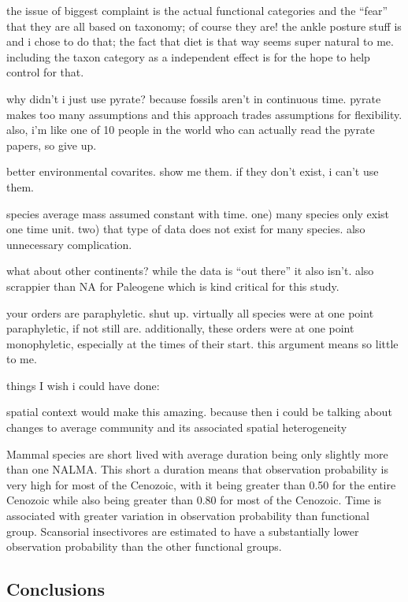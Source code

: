 \documentclass[12pt,letterpaper]{article}
\begin{document}
the issue of biggest complaint is the actual functional categories and the ``fear'' that they are all based on taxonomy; of course they are! the ankle posture stuff is and i chose to do that; the fact that diet is that way seems super natural to me. including the taxon category as a independent effect is for the hope to help control for that. 

why didn't i just use pyrate? because fossils aren't in continuous time. pyrate makes too many assumptions and this approach trades assumptions for flexibility. also, i'm like one of 10 people in the world who can actually read the pyrate papers, so give up.

better environmental covarites. show me them. if they don't exist, i can't use them.

species average mass assumed constant with time. one) many species only exist one time unit. two) that type of data does not exist for many species. also unnecessary complication.

what about other continents? while the data is ``out there'' it also isn't. also scrappier than NA for Paleogene which is kind critical for this study.

your orders are paraphyletic. shut up. virtually all species were at one point paraphyletic, if not still are. additionally, these orders were at one point monophyletic, especially at the times of their start. this argument means so little to me.



things I wish i could have done:

spatial context would make this amazing. because then i could be talking about changes to average community and its associated spatial heterogeneity






Mammal species are short lived with average duration being only slightly more than one NALMA. This short a duration means that observation probability is very high for most of the Cenozoic, with it being greater than 0.50 for the entire Cenozoic while also being greater than 0.80 for most of the Cenozoic. Time is associated with greater variation in observation probability than functional group. Scansorial insectivores are estimated to have a substantially lower observation probability than the other functional groups.




\subsection*{Conclusions}
\end{document}
